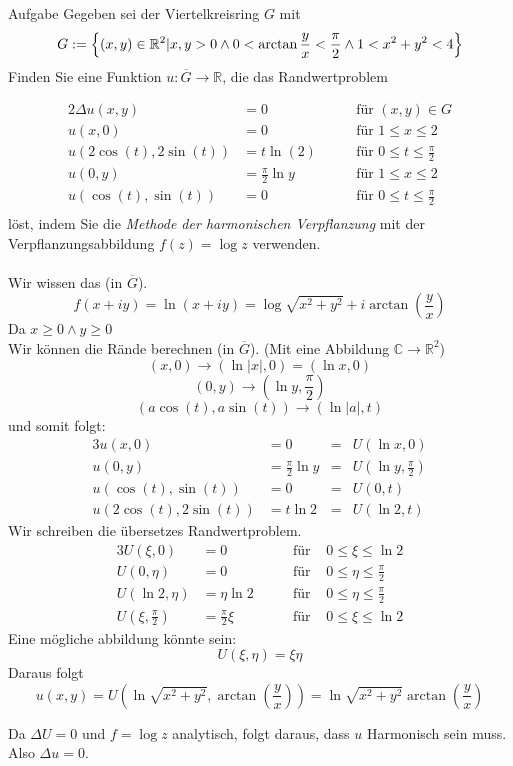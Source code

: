 \documentclass{scrartcl}
\def\mbb#1{\mathbb{#1}}
\def\bC{\mbb{C}}
\def\bR{\mbb{R}}
\newcommand{\func}[3]{#1\colon#2\to#3}
\begin{document}
\begin{section}{Aufgabe}%
Gegeben sei der Viertelkreisring $G$ mit
\[G:=\qty{(x,y)\in\bR^2 |x,y>0 \land 0<\arctan\frac{y}{x}<\frac{\pi}2 \land 1<x^2+y^2<4}\]
Finden Sie eine Funktion $\func{u}{\overline{G}}{\bR}$, die das Randwertproblem

\begin{alignat*}{2}
\Delta u(x,y)&=0 \hspace{2em}    & \text{für } (x,y)\in G\\
u(x,0)&=0 \hspace{2em}   & \text{für } 1\leq x \leq 2\\
u(2 \cos(t),2\sin(t))&=t \ln (2) \hspace{2em}   & \text{für } 0\leq t \leq \frac\pi 2\\
u(0,y)&=\frac \pi 2 \ln y \hspace{2em}   & \text{für } 1\leq x \leq 2\\
u(\cos(t),\sin(t))&=0 \hspace{2em}   & \text{für } 0\leq t \leq \frac\pi 2\\
\end{alignat*}
löst, indem Sie die {\em Methode der harmonischen Verpflanzung} mit der Verpflanzungsabbildung $f(z) = \log z$ verwenden.\\
\\
Wir wissen das (in $\overline G$).
\[f(x+i y)=\ln(x+iy)=\log\sqrt{x^2+y^2}+i \arctan(\frac y x)\]
Da $x\geq 0 \land y\geq 0$\\
Wir können die Rände berechnen (in $\overline G$). (Mit eine Abbildung $\bC \rightarrow \bR^2$)
\[(x,0)\rightarrow (\ln |x|,0)=(\ln x,0)\]
\[(0,y)\rightarrow (\ln y,\frac{\pi}{2})\] 
\[(a \cos(t),a \sin(t))\rightarrow (\ln |a|,t)\]
und somit folgt:
\begin{alignat*}{3}
u(x,0)&=0  &=&U(\ln x,0)\\
u(0,y)&=\frac \pi 2 \ln y  &=&U(\ln y,\frac \pi 2)\\
u(\cos(t),\sin(t)) &=0 &=&U(0,t)\\
u(2\cos(t),2\sin(t))&=t \ln 2  &=&U(\ln 2,t)
\end{alignat*}
Wir schreiben die übersetzes Randwertproblem.
\begin{alignat*}{3}
U(\xi,0)&=0 \hspace{2em}   & \text{für }& 0\leq \xi \leq \ln 2\\
U(0,\eta)&=0 \hspace{2em}   & \text{für }& 0\leq \eta \leq \frac \pi 2\\
U(\ln 2,\eta)&=\eta \ln 2 \hspace{2em}   & \text{für }& 0\leq \eta \leq \frac \pi 2\\
U(\xi,\frac \pi 2)&=\frac \pi 2 \xi \hspace{2em}   & \text{für }& 0\leq \xi \leq \ln 2
\end{alignat*}
Eine mögliche abbildung könnte sein:
\[U(\xi,\eta)=\xi \eta \]
Daraus folgt
\[u(x,y)=U(\ln\sqrt{x^2+y^2},\arctan(\frac y x))=\ln\sqrt{x^2+y^2}\arctan(\frac y x)\]

Da $\Delta U =0$ und $f=\log z$ analytisch, folgt daraus, dass $u$ Harmonisch sein muss. Also $\Delta u=0$.
\end{section}
\end{document}
